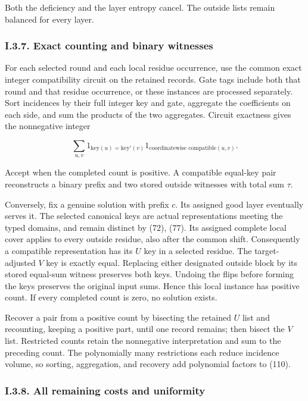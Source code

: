 Both the deficiency and the layer entropy cancel. The outside lists remain balanced for every layer.

\hypertarget{af-a9ec399514-i.3.7.-exact-counting-and-binary-witnesses}{%
\subsubsection{I.3.7. Exact counting and binary witnesses}\label{af-a9ec399514-i.3.7.-exact-counting-and-binary-witnesses}}

For each selected round and each local residue occurrence, use the common exact integer compatibility circuit on the retained records. Gate tags include both that round and that residue occurrence, or these instances are processed separately. Sort incidences by their full integer key and gate, aggregate the coefficients on each side, and sum the products of the two aggregates. Circuit exactness gives the nonnegative integer

\[
\sum_{u,v}
1_{\mathrm{key}(u)=\mathrm{key}'(v)}
1_{\text{coordinatewise compatible}(u,v)}.
\tag{111}
\]

Accept when the completed count is positive. A compatible equal-key pair reconstructs a binary prefix and two stored outside witnesses with total sum \(\tau\).

Conversely, fix a genuine solution with prefix \(c\). Its assigned good layer eventually serves it. The selected canonical keys are actual representations meeting the typed domains, and remain distinct by (72), (77). Its assigned complete local cover applies to every outside residue, also after the common shift. Consequently a compatible representation has its \(U\) key in a selected residue. The target-adjusted \(V\) key is exactly equal. Replacing either designated outside block by its stored equal-sum witness preserves both keys. Undoing the flips before forming the keys preserves the original input sums. Hence this local instance has positive count. If every completed count is zero, no solution exists.

Recover a pair from a positive count by bisecting the retained \(U\) list and recounting, keeping a positive part, until one record remains; then bisect the \(V\) list. Restricted counts retain the nonnegative interpretation and sum to the preceding count. The polynomially many restrictions each reduce incidence volume, so sorting, aggregation, and recovery add polynomial factors to (110).

\hypertarget{af-a9ec399514-i.3.8.-all-remaining-costs-and-uniformity}{%
\subsubsection{I.3.8. All remaining costs and uniformity}\label{af-a9ec399514-i.3.8.-all-remaining-costs-and-uniformity}}

